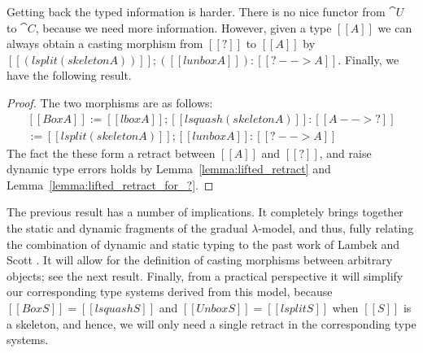 Getting back the typed information is harder.  There is no nice
functor from $\cat{U}$ to $\cat{C}$, because we need more information.
However, given a type $[[A]]$ we can always obtain a casting morphism
from $[[?]]$ to $[[A]]$ by $[[(lsplit (skeleton A))]];([[lunbox A]]) :
[[? --> A]]$.  Finally, we have the following result.
\begin{proof}
  The two morphisms are as follows:
  \[
  \begin{array}{lll}
    [[Box A]] := [[lbox A]];[[lsquash (skeleton A)]] : [[A --> ?]]\\
    [[Unbox A]] := [[lsplit (skeleton A)]];[[lunbox A]] : [[? --> A]]
  \end{array}
  \]
  \noindent
  The fact the these form a retract between $[[A]]$ and $[[?]]$, and
  raise dynamic type errors holds by Lemma~\ref{lemma:lifted_retract}
  and Lemma~\ref{lemma:lifted_retract_for_?}.
\end{proof}
The previous result has a number of implications.  It completely
brings together the static and dynamic fragments of the gradual
$\lambda$-model, and thus, fully relating the combination of dynamic
and static typing to the past work of Lambek and Scott
\cite{Scott:1980,Lambek:1980}.  It will allow for the definition of
casting morphisms between arbitrary objects; see the next result.
Finally, from a practical perspective it will simplify our
corresponding type systems derived from this model, because $[[Box S]]
= [[lsquash S]]$ and $[[Unbox S]] = [[lsplit S]]$ when $[[S]]$ is a
skeleton, and hence, we will only need a single retract in the
corresponding type systems.

